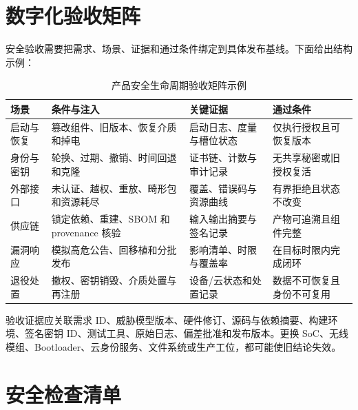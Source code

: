\section{数字化验收矩阵}

安全验收需要把需求、场景、证据和通过条件绑定到具体发布基线。下面给出结构示例：

\begin{table}[H]
  \centering
  \caption{产品安全生命周期验收矩阵示例}
  \begin{tabular}{p{27mm}p{40mm}p{37mm}p{30mm}}
    \hline
    场景 & 条件与注入 & 关键证据 & 通过条件 \\
    \hline
    启动与恢复 & 篡改组件、旧版本、恢复介质和掉电 & 启动日志、度量与槽位状态 & 仅执行授权且可恢复版本 \\
    身份与密钥 & 轮换、过期、撤销、时间回退和克隆 & 证书链、计数与审计记录 & 无共享秘密或旧授权复活 \\
    外部接口 & 未认证、越权、重放、畸形包和资源耗尽 & 覆盖、错误码与资源曲线 & 有界拒绝且状态不改变 \\
    供应链 & 锁定依赖、重建、SBOM 和 provenance 核验 & 输入输出摘要与签名记录 & 产物可追溯且组件完整 \\
    漏洞响应 & 模拟高危公告、回移植和分批发布 & 影响清单、时限与覆盖率 & 在目标时限内完成闭环 \\
    退役处置 & 撤权、密钥销毁、介质处置与再注册 & 设备/云状态和处置记录 & 数据不可恢复且身份不可复用 \\
    \hline
  \end{tabular}
\end{table}

验收证据应关联需求 ID、威胁模型版本、硬件修订、源码与依赖摘要、构建环境、签名密钥 ID、测试工具、原始日志、偏差批准和发布版本。更换 SoC、无线模组、Bootloader、云身份服务、文件系统或生产工位，都可能使旧结论失效。

\section{安全检查清单}

